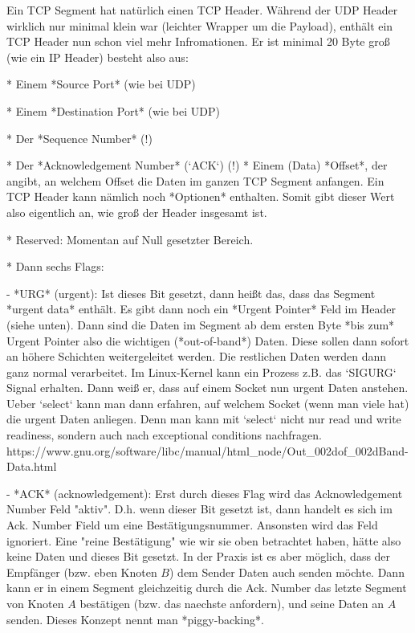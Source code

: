Ein TCP Segment hat natürlich einen TCP Header. Während der UDP Header wirklich
nur minimal klein war (leichter Wrapper um die Payload), enthält ein TCP Header
nun schon viel mehr Infromationen. Er ist minimal 20 Byte groß (wie ein IP
Header) besteht also aus:

* Einem *Source Port* (wie bei UDP)

* Einem *Destination Port* (wie bei UDP)

* Der *Sequence Number* (!)

* Der *Acknowledgement Number* (`ACK`) (!)
* Einem (Data) *Offset*, der angibt, an welchem Offset die Daten im ganzen TCP
  Segment anfangen. Ein TCP Header kann nämlich noch *Optionen* enthalten. Somit
  gibt dieser Wert also eigentlich an, wie groß der Header insgesamt ist.

* Reserved: Momentan auf Null gesetzter Bereich.

* Dann sechs Flags:

	- *URG* (urgent): Ist dieses Bit gesetzt, dann heißt das, dass das Segment
	*urgent data* enthält. Es gibt dann noch ein *Urgent Pointer* Feld im Header
	(siehe unten). Dann sind die Daten im Segment ab dem ersten Byte *bis zum*
	Urgent Pointer also die wichtigen (*out-of-band*) Daten. Diese sollen dann
	sofort an höhere Schichten weitergeleitet werden. Die restlichen Daten
	werden dann ganz normal verarbeitet. Im Linux-Kernel kann ein Prozess
	z.B. das `SIGURG` Signal erhalten. Dann weiß er, dass auf einem Socket nun
	urgent Daten anstehen. Ueber `select` kann man dann erfahren, auf welchem
	Socket (wenn man viele hat) die urgent Daten anliegen. Denn man kann mit
	`select` nicht nur read und write readiness, sondern auch nach exceptional
	conditions nachfragen.
	https://www.gnu.org/software/libc/manual/html_node/Out_002dof_002dBand-Data.html

   - *ACK* (acknowledgement): Erst durch dieses Flag wird das Acknowledgement
	 Number Feld "aktiv". D.h. wenn dieser Bit gesetzt ist, dann handelt es sich
	 im Ack. Number Field um eine Bestätigungsnummer. Ansonsten wird das Feld
	 ignoriert. Eine "reine Bestätigung" wie wir sie oben betrachtet haben,
	 hätte also keine Daten und dieses Bit gesetzt. In der Praxis ist es aber
	 möglich, dass der Empfänger (bzw. eben Knoten $B$) dem Sender Daten auch
	 senden möchte. Dann kann er in einem Segment gleichzeitig durch die
	 Ack. Number das letzte Segment von Knoten $A$ bestätigen (bzw. das naechste
	 anfordern), und seine Daten an $A$ senden. Dieses Konzept nennt man
	 *piggy-backing*.


